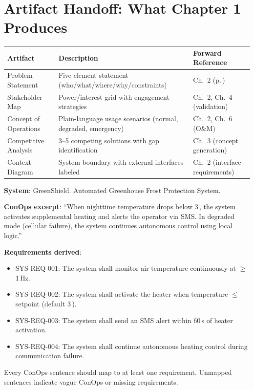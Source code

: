 \section{Artifact Handoff: What Chapter 1 Produces}
\begin{table}[htbp]\centering\small
\begin{tabularx}{\textwidth}{l X l}
\toprule
\textbf{Artifact} & \textbf{Description} & \textbf{Forward Reference} \\
\midrule
Problem Statement & Five-element statement (who/what/where/why/constraints) & Ch.~2 (p.\,\pageref{ch:value}) \\
Stakeholder Map & Power/interest grid with engagement strategies & Ch.~2, Ch.~4 (validation) \\
Concept of Operations & Plain-language usage scenarios (normal, degraded, emergency) & Ch.~2, Ch.~6 (O\&M) \\
Competitive Analysis & 3--5 competing solutions with gap identification & Ch.~3 (concept generation) \\
Context Diagram & System boundary with external interfaces labeled & Ch.~2 (interface requirements) \\
\bottomrule
\end{tabularx}
\end{table}


\begin{greenshieldbox}
\textbf{System}: GreenShield. Automated Greenhouse Frost Protection System.

\textbf{ConOps excerpt}: ``When nighttime temperature drops below 3\,\degC{}, the system activates supplemental heating and alerts the operator via SMS. In degraded mode (cellular failure), the system continues autonomous control using local logic.''

\textbf{Requirements derived}:
\begin{itemize}[nosep,leftmargin=1.5em]
\item SYS-REQ-001: The system shall monitor air temperature continuously at $\geq$1\,Hz.
\item SYS-REQ-002: The system shall activate the heater when temperature $\leq$ setpoint (default 3\,\degC{}).
\item SYS-REQ-003: The system shall send an SMS alert within 60\,s of heater activation.
\item SYS-REQ-004: The system shall continue autonomous heating control during communication failure.
\end{itemize}
Every ConOps sentence should map to at least one requirement. Unmapped sentences indicate vague ConOps or missing requirements.
\end{greenshieldbox}

